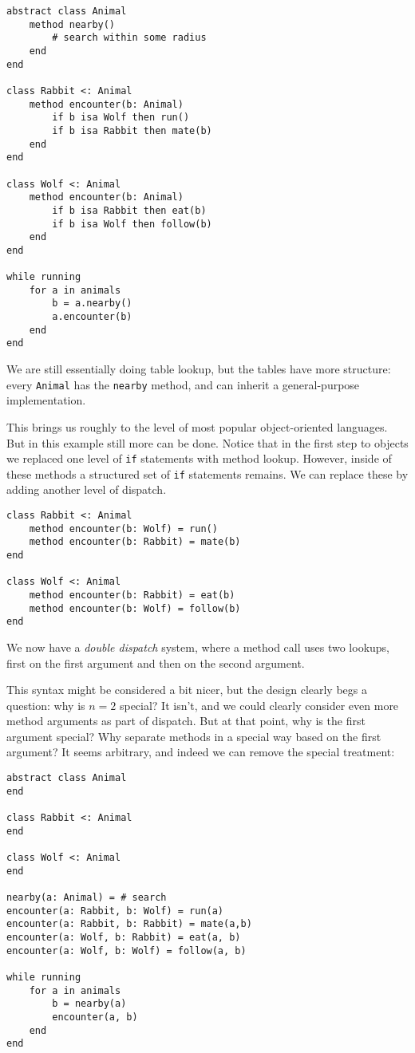 \begin{verbatim}
abstract class Animal
    method nearby()
        # search within some radius
    end
end

class Rabbit <: Animal
    method encounter(b: Animal)
        if b isa Wolf then run()
        if b isa Rabbit then mate(b)
    end
end

class Wolf <: Animal
    method encounter(b: Animal)
        if b isa Rabbit then eat(b)
        if b isa Wolf then follow(b)
    end
end

while running
    for a in animals
        b = a.nearby()
        a.encounter(b)
    end
end
\end{verbatim}

We are still essentially doing table lookup, but the tables have
more structure: every \texttt{Animal} has the \texttt{nearby}
method, and can inherit a general-purpose implementation.

This brings us roughly to the level of most popular object-oriented
languages. But in this example still more can be done. Notice that
in the first step to objects we replaced one level of \texttt{if}
statements with method lookup. However, inside of these methods
a structured set of \texttt{if} statements remains. We can
replace these by adding another level of dispatch.

\begin{verbatim}
class Rabbit <: Animal
    method encounter(b: Wolf) = run()
    method encounter(b: Rabbit) = mate(b)
end

class Wolf <: Animal
    method encounter(b: Rabbit) = eat(b)
    method encounter(b: Wolf) = follow(b)
end
\end{verbatim}

We now have a \emph{double dispatch} system, where a method call
uses two lookups, first on the first argument and then on the
second argument.

This syntax might be considered a bit nicer, but the design
clearly begs a question: why is $n=2$ special? It isn't, and we
could clearly consider even more method arguments as part of
dispatch. But at that point, why is the first argument special?
Why separate methods in a special way based on the first argument?
It seems arbitrary, and indeed we can remove the special treatment:

\begin{verbatim}
abstract class Animal
end

class Rabbit <: Animal
end

class Wolf <: Animal
end

nearby(a: Animal) = # search
encounter(a: Rabbit, b: Wolf) = run(a)
encounter(a: Rabbit, b: Rabbit) = mate(a,b)
encounter(a: Wolf, b: Rabbit) = eat(a, b)
encounter(a: Wolf, b: Wolf) = follow(a, b)

while running
    for a in animals
        b = nearby(a)
        encounter(a, b)
    end
end
\end{verbatim}

